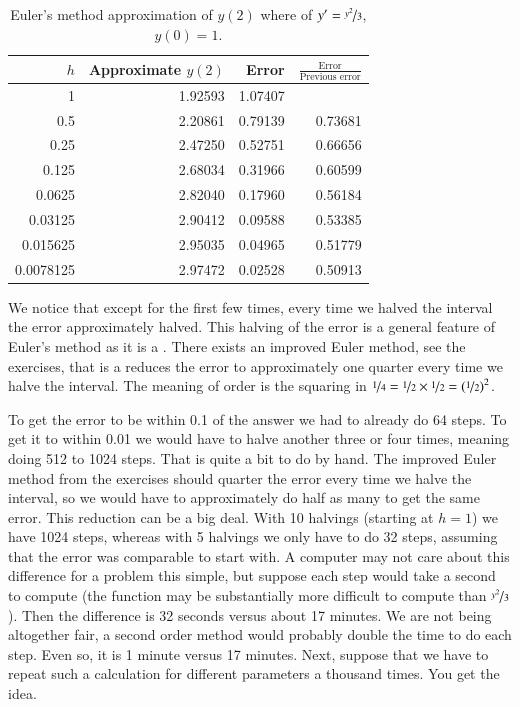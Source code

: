 \documentclass[12pt]{book}
\begin{document}
\begin{table}[h!t]
\capstart
\begin{center}
\begin{tabular}{@{}rrrr@{}}
\toprule
$h$ & Approximate $y(2)$ & Error & $\frac{\text{Error}}{\text{Previous
error}}$ \\
\midrule
1        & 1.92593 & 1.07407 & \\
0.5      & 2.20861 & 0.79139 & 0.73681 \\
0.25     & 2.47250 & 0.52751 & 0.66656 \\
0.125    & 2.68034 & 0.31966 & 0.60599 \\
0.0625   & 2.82040 & 0.17960 & 0.56184 \\
0.03125  & 2.90412 & 0.09588 & 0.53385 \\
0.015625 & 2.95035 & 0.04965 & 0.51779 \\
0.0078125& 2.97472 & 0.02528 & 0.50913 \\
\bottomrule
\end{tabular}
\end{center}
\caption{Euler's method approximation of $y(2)$ where
of $y'=\nicefrac{y^2}{3}$, $y(0)=1$.\label{euler-table:table}}
\end{table}

We notice that except for the first few times, every time we halved 
the interval the error approximately halved.
This halving of the error is a general feature of Euler's method as it is a
\emph{}.
There exists an improved Euler method, see the exercises,
that is a 
reduces the error to approximately one
quarter every time we halve the interval.  The meaning of
 order is the squaring in $\nicefrac{1}{4} = \nicefrac{1}{2} \times
\nicefrac{1}{2} = {(\nicefrac{1}{2})}^2$.

To get the error to be within 0.1 of the answer we had to already
do 64 steps.  To get it to within 0.01 we would have to halve another three or
four times, meaning doing 512 to 1024 steps.  That is quite a bit to do by
hand.  The improved Euler method from the exercises
should quarter the
error every time we halve the interval, so we would have to approximately do half as many
 to get the same error.  This reduction can be a big deal.  With 10
halvings (starting at $h=1$) we have 1024 steps, whereas with 5 halvings
we only have to do 32 steps, assuming that the error was comparable to start
with.  A computer may not care about this
difference for a problem this simple, but suppose each step would take a
second to compute (the function may be substantially more difficult to compute
than $\nicefrac{y^2}{3}$).  Then the difference is 32 seconds versus about 17 minutes.
We are not being altogether fair, a second order method would probably
double the time to do each step.  Even so, it is 1 minute versus 17 minutes.
Next, suppose that we have to repeat such a calculation for different
parameters a thousand times.  You get the idea.
\end{document}
